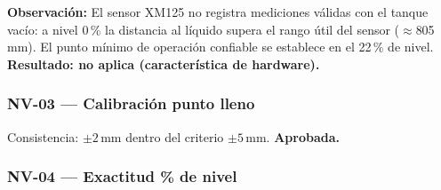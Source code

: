 \noindent\textbf{Observación:} El sensor XM125 no registra mediciones válidas con el
tanque vacío: a nivel 0\,\% la distancia al líquido supera el rango útil del sensor
($\approx$805\,mm). El punto mínimo de operación confiable se establece en el 22\,\%
de nivel. \textbf{Resultado: no aplica (característica de hardware).}

\subsubsection*{NV-03 --- Calibración punto lleno}

\begin{table}[H]
\centering
\caption{Calibración del sensor en estado lleno.}
\label{tab:nv03}
\renewcommand{\arraystretch}{1.3}\small
{}
\end{table}

\noindent Consistencia: $\pm 2$\,mm dentro del criterio $\pm 5$\,mm. \textbf{Aprobada.}

\subsubsection*{NV-04 --- Exactitud \% de nivel}

\begin{table}[H]
\centering
\caption{Exactitud del porcentaje de nivel en cuatro puntos de verificación.}
\label{tab:nv04}
\renewcommand{\arraystretch}{1.3}\small
{}
\end{table}

